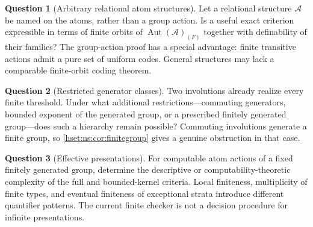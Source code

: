 \documentclass[11pt,letterpaper]{article}
\theoremstyle{definition}
\newtheorem{question}[question]{Question}\aliascntresetthe{question}
\theoremstyle{remark}
\newcommand{\cf}{\operatorname{cf}}
\newcommand{\Aut}{\operatorname{Aut}}
\newcommand{\lbl}[1]{\nolinkurl{#1}}
\newcommand{\repo}[1]{\nolinkurl{#1}}
\begin{document}
\begin{question}[Arbitrary relational atom structures]\label{hset:ns:q:relational}
Let a relational structure $\mathcal A$ be named on the atoms, rather than a group action. Is a useful exact criterion expressible in terms of finite orbits of $\Aut(\mathcal A)_{(F)}$ together with definability of their families? The group-action proof has a special advantage: finite transitive actions admit a pure set of uniform codes. General structures may lack a comparable finite-orbit coding theorem.
\end{question}

\begin{question}[Restricted generator classes]\label{hset:ns:q:generators}
Two involutions already realize every finite threshold. Under what additional restrictions---commuting generators, bounded exponent of the generated group, or a prescribed finitely generated group---does such a hierarchy remain possible? Commuting involutions generate a finite group, so \cref{hset:ns:cor:finitegroup} gives a genuine obstruction in that case.
\end{question}
\noindent[Added 4 October 2026, batch~90: Question~10.4 (``Commuting named
automorphisms'') of \repo{naming-elementary-embeddings} asks for the sharp
threshold for a fixed number of commuting named permutations, at uncountable
cutoffs. The remark on commuting involutions above is its case $\kappa=\omega$
for involutions. Neither question is answered. Added 4 October 2026, batch~93: that
report's Question~10.4 is now answered (its Theorem~15.3,
\lbl{nee:ca:thm:commuting}: every fixed number of commuting named permutations
keeps Replacement for every action iff $\cf\kappa>\omega$), and for a
prescribed finitely generated group named by generators its Theorem~18.2
(\lbl{nee:ca:grp:robust}) gives full Replacement for every action iff $G$ is
finite at $\kappa=\omega$ and iff $\cf\kappa>\tau(G)$ above. The graded
hierarchy asked about here, under these restrictions, remains open.]

\begin{question}[Effective presentations]\label{hset:ns:q:effective}
For computable atom actions of a fixed finitely generated group, determine the descriptive or computability-theoretic complexity of the full and bounded-kernel criteria. Local finiteness, multiplicity of finite types, and eventual finiteness of exceptional strata introduce different quantifier patterns. The current finite checker is not a decision procedure for infinite presentations.
\end{question}
\end{document}
